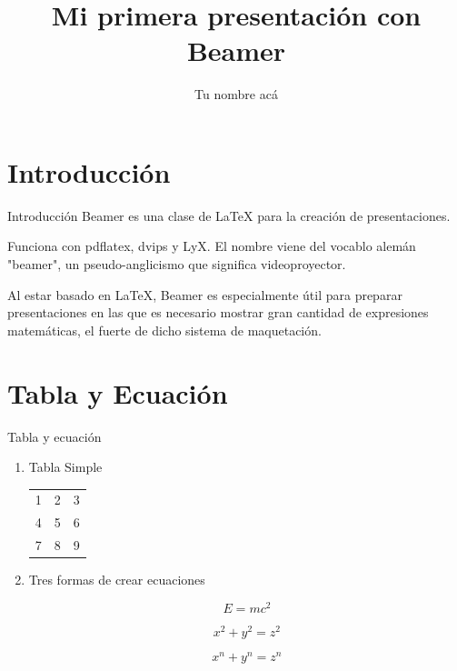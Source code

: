 \documentclass[a4paper,10pt]{beamer}
\begin{document}
\begin{frame}
\title{Mi primera presentaci\'on con Beamer}
\author{Tu nombre ac\'a}
\date{}
\maketitle
\end{frame}

\section[\'Indice]{}

\section{Introducci\'on}
\begin{frame}{Introducci\'on}
\justify
Beamer es una clase de LaTeX para la creaci\'on de
presentaciones.

\vspace{0.3cm}
\begin{justify}
Funciona con pdflatex, dvips y LyX. El nombre 
viene del vocablo alem\'an "beamer", un pseudo-anglicismo 
que significa videoproyector. 

\vspace{0.3cm}

Al estar basado en LaTeX, Beamer es especialmente 
\'util para preparar presentaciones en las que es 
necesario mostrar gran cantidad de expresiones
matem\'aticas,  el fuerte de dicho sistema de maquetaci\'on.
\end{justify}
\end{frame}

\section{Tabla y Ecuaci\'on}
\begin{frame}{Tabla y ecuaci\'on}
  
\begin{enumerate}
 \item Tabla Simple
 
\begin{center}
 \begin{tabular}{l c r } 
	    1 & 2 & 3 %
	    \\ 4 & 5 & 6  %
	    \\ 7 & 8 & 9 \\ %
\end{tabular}
\end{center}

 \item Tres formas de crear ecuaciones

\begin{equation}
E = mc^2
\end{equation}

$$
x^2 + y^2 = z^2
$$

\[ x^n + y^n = z^n \]
\end{enumerate}
\end{frame}
\end{document}
